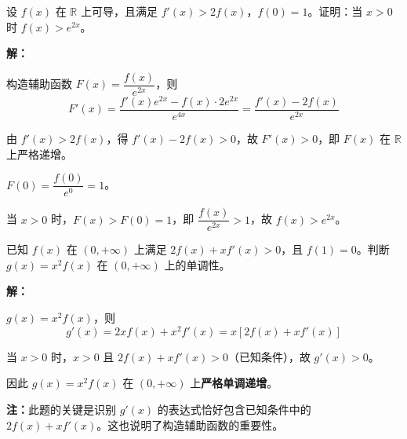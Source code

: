 \documentclass[12pt,a4paper]{ctexart}
\begin{document}
\begin{examplebox}[例9]
设 $f(x)$ 在 $\mathbb{R}$ 上可导，且满足 $f'(x)>2f(x)$，$f(0)=1$。证明：当 $x>0$ 时 $f(x)>e^{2x}$。

\medskip
\textbf{解：}

构造辅助函数 $F(x)=\dfrac{f(x)}{e^{2x}}$，则
\[F'(x)=\frac{f'(x)e^{2x}-f(x)\cdot2e^{2x}}{e^{4x}}=\frac{f'(x)-2f(x)}{e^{2x}}\]

由 $f'(x)>2f(x)$，得 $f'(x)-2f(x)>0$，故 $F'(x)>0$，即 $F(x)$ 在 $\mathbb{R}$ 上严格递增。

$F(0)=\dfrac{f(0)}{e^0}=1$。

当 $x>0$ 时，$F(x)>F(0)=1$，即 $\dfrac{f(x)}{e^{2x}}>1$，故 $\boxed{f(x)>e^{2x}}$。
\end{examplebox}

\begin{examplebox}[例10]
已知 $f(x)$ 在 $(0,+\infty)$ 上满足 $2f(x)+xf'(x)>0$，且 $f(1)=0$。判断 $g(x)=x^2f(x)$ 在 $(0,+\infty)$ 上的单调性。

\medskip
\textbf{解：}

$g(x)=x^2f(x)$，则
\[g'(x)=2xf(x)+x^2f'(x)=x[2f(x)+xf'(x)]\]

当 $x>0$ 时，$x>0$ 且 $2f(x)+xf'(x)>0$（已知条件），故 $g'(x)>0$。

因此 $g(x)=x^2f(x)$ 在 $(0,+\infty)$ 上\textbf{严格单调递增}。

\medskip
\textbf{注：}此题的关键是识别 $g'(x)$ 的表达式恰好包含已知条件中的 $2f(x)+xf'(x)$。这也说明了构造辅助函数的重要性。
\end{examplebox}
\end{document}
